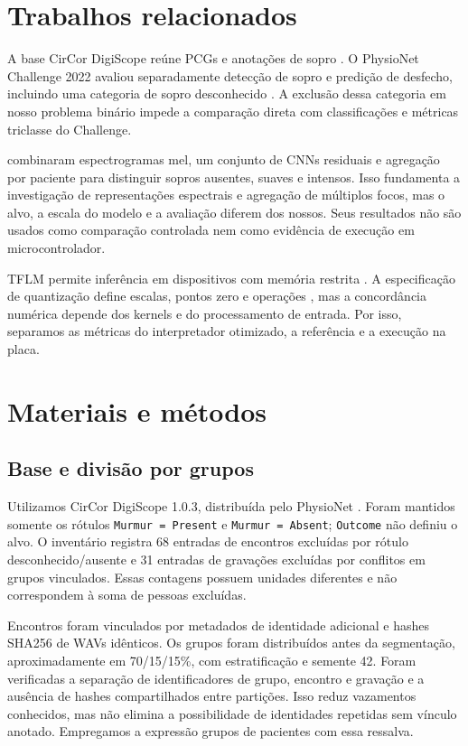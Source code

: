 \documentclass[9pt,twocolumn,twoside,lineno]{MSBJournal}
\begin{document}
\section{Trabalhos relacionados}
A base CirCor DigiScope reúne PCGs e anotações de sopro \citep{oliveira2022circor,circor103}. O PhysioNet Challenge 2022 avaliou separadamente detecção de sopro e predição de desfecho, incluindo uma categoria de sopro desconhecido \citep{reyna2023challenge}. A exclusão dessa categoria em nosso problema binário impede a comparação direta com classificações e métricas triclasse do Challenge.

\citet{elola2023grading} combinaram espectrogramas mel, um conjunto de CNNs residuais e agregação por paciente para distinguir sopros ausentes, suaves e intensos. Isso fundamenta a investigação de representações espectrais e agregação de múltiplos focos, mas o alvo, a escala do modelo e a avaliação diferem dos nossos. Seus resultados não são usados como comparação controlada nem como evidência de execução em microcontrolador.

TFLM permite inferência em dispositivos com memória restrita \citep{david2021tflm}. A especificação de quantização define escalas, pontos zero e operações \citep{int8spec}, mas a concordância numérica depende dos kernels e do processamento de entrada. Por isso, separamos as métricas do interpretador otimizado, a referência e a execução na placa.

\section{Materiais e métodos}
\subsection{Base e divisão por grupos}
Utilizamos CirCor DigiScope 1.0.3, distribuída pelo PhysioNet \citep{circor103,pollard_physionet_2026}. Foram mantidos somente os rótulos \texttt{Murmur = Present} e \texttt{Murmur = Absent}; \texttt{Outcome} não definiu o alvo. O inventário registra 68 entradas de encontros excluídas por rótulo desconhecido/ausente e 31 entradas de gravações excluídas por conflitos em grupos vinculados. Essas contagens possuem unidades diferentes e não correspondem à soma de pessoas excluídas.

Encontros foram vinculados por metadados de identidade adicional e hashes SHA256 de WAVs idênticos. Os grupos foram distribuídos antes da segmentação, aproximadamente em 70/15/15\%, com estratificação e semente 42. Foram verificadas a separação de identificadores de grupo, encontro e gravação e a ausência de hashes compartilhados entre partições. Isso reduz vazamentos conhecidos, mas não elimina a possibilidade de identidades repetidas sem vínculo anotado. Empregamos a expressão grupos de pacientes com essa ressalva.
\end{document}
